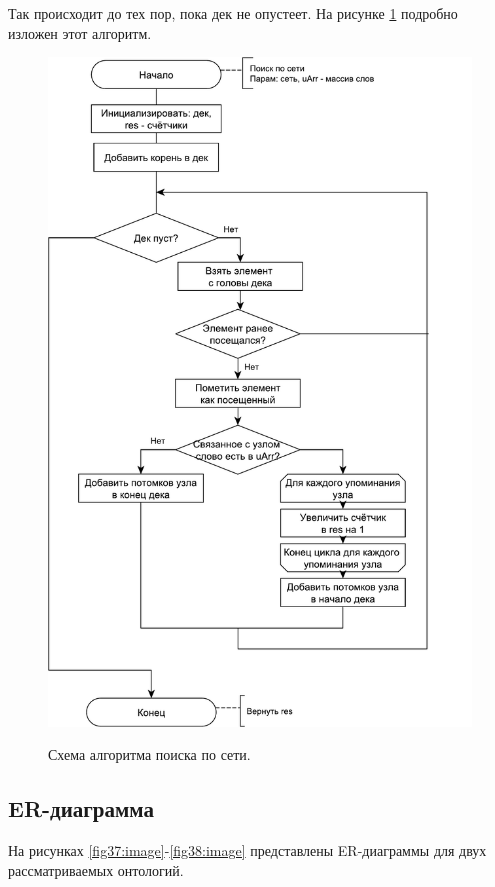 Так происходит до тех пор, пока дек не опустеет. На рисунке \ref{fig36:image} подробно изложен этот алгоритм.
\begin{figure}[h!]
	\begin{center}
		{\includegraphics[scale = 0.6]{img/schemes/pdf/searchTree.pdf}}
		\caption{Схема алгоритма поиска по сети.}
		\label{fig36:image}
	\end{center}
\end{figure}

\newpage

\subsection{ER-диаграмма}
На рисунках \ref{fig37:image}-\ref{fig38:image} представлены ER-диаграммы для двух рассматриваемых онтологий. 

